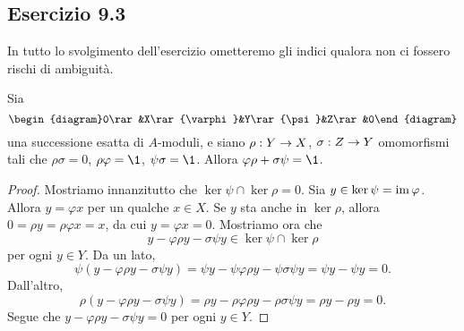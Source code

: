 \documentclass[a4paper]{article}
\begin{document}
\subsection*{Esercizio 9.3}
In tutto lo svolgimento dell'esercizio ometteremo gli indici qualora non ci fossero rischi di ambiguità.

\begin{lemma*}
Sia 
$$
\begin{diagram}0\rar&X\rar{\varphi}&Y\rar{\psi}&Z\rar&0\end{diagram}
$$
una successione esatta di $A$-moduli, e siano $\rho:Y\rightarrow X$, $\sigma:Z\rightarrow Y$ omomorfismi tali che $\rho\sigma=0$, $\rho\varphi=\1$, $\psi\sigma=\1$. Allora $\varphi\rho+\sigma\psi=\1$.
\end{lemma*}
\begin{proof}
Mostriamo innanzitutto che $\ker\psi\cap\ker\rho=0$. Sia $y\in\ker\psi=\operatorname{im}\varphi$. Allora $y=\varphi x$ per un qualche $x\in X$. Se $y$ sta anche in $\ker\rho$, allora $0=\rho y=\rho\varphi x=x$, da cui $y=\varphi x=0$. Mostriamo ora che
$$
y-\varphi\rho y-\sigma\psi y\in\ker\psi\cap\ker\rho
$$
per ogni $y\in Y$. Da un lato,
$$
\psi(y-\varphi\rho y-\sigma\psi y)=\psi y-\psi\varphi\rho y-\psi\sigma\psi y=\psi y-\psi y=0.
$$
Dall'altro,
$$
\rho(y-\varphi\rho y-\sigma\psi y)=\rho y-\rho\varphi\rho y-\rho\sigma\psi y=\rho y-\rho y=0.
$$
Segue che $y-\varphi\rho y-\sigma\psi y=0$ per ogni $y\in Y$.
\end{proof}
\end{document}
